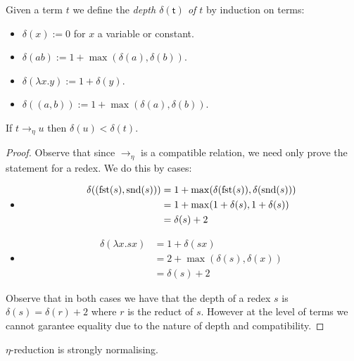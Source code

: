 \begin{defin}
    Given a term $t$ we define the \emph{depth $\mathsf{\delta(t)}$ of $t$} by induction on terms:
    \begin{itemize}
        \item $\delta (x):=0$ for $x$ a variable or constant.
        \item $\delta (a b) := 1+ \max(\delta(a), \delta(b))$.
        \item $\delta (\lambda x . y):= 1 + \delta(y)$.
        \item $\delta ((a, b)) := 1 + \max(\delta(a), \delta(b))$.  
    \end{itemize}
\end{defin}

\begin{lemma}\label{eta_red_bound}
    If $t \to_{\eta} u$ then $\delta(u) < \delta(t)$.
\end{lemma}

\begin{proof}
    Observe that since $\to_{\eta}$ is a compatible relation, we need only prove the statement for a redex. We do this by cases:
    \begin{itemize}
        \item
        $$
            \begin{aligned}
                \delta ((\mathrm{fst}(s), \mathrm{snd}(s))) &= 1+ \max(\delta(\mathrm{fst}(s)), \delta(\mathrm{snd}(s))) \\
                &= 1 + \max(1+ \delta(s), 1+ \delta(s)) \\
                &= \delta(s)+ 2
            \end{aligned}
        $$
        \item
        $$
            \begin{aligned}
                \delta (\lambda x . s x) &= 1 + \delta(s x) \\
                &= 2 + \max(\delta(s), \delta(x)) \\
                &= \delta(s) + 2
            \end{aligned}
        $$
    \end{itemize}
    Observe that in both cases we have that the depth of a redex $s$ is $\delta(s) = \delta(r) + 2$ where $r$ is the reduct of $s$. However at the level of terms we cannot garantee equality due to the nature of depth and compatibility. 
\end{proof}

\begin{lemma}
    $\eta$-reduction is strongly normalising.
\end{lemma}

